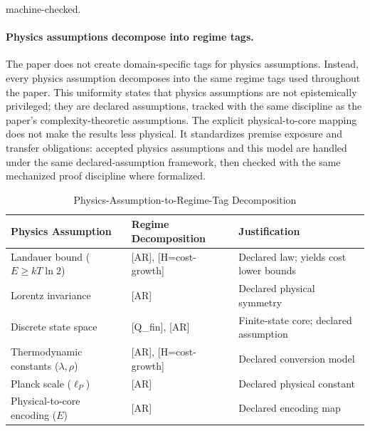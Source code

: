 machine-checked.

\paragraph{Physics assumptions decompose into regime tags.}
The paper does not create domain-specific tags for physics assumptions. Instead, every physics assumption decomposes into the same regime tags used throughout the paper. This uniformity states that physics assumptions are not epistemically privileged; they are declared assumptions, tracked with the same discipline as the paper's complexity-theoretic assumptions.
The explicit physical-to-core mapping does not make the results less physical. It standardizes premise exposure and transfer obligations: accepted physics assumptions and this model are handled under the same declared-assumption framework, then checked with the same mechanized proof discipline where formalized.

\begin{table}[h]
\centering
\caption{Physics-Assumption-to-Regime-Tag Decomposition}
\label{tab:physics-regime-decomposition}
\begin{tabular}{@{}lll@{}}
\toprule
\textbf{Physics Assumption} & \textbf{Regime Decomposition} & \textbf{Justification} \\
\midrule
Landauer bound ($E \ge kT\ln 2$) & [AR], [H=cost-growth] & Declared law; yields cost lower bounds \\
Lorentz invariance & [AR] & Declared physical symmetry \\
Discrete state space & [Q\_fin], [AR] & Finite-state core; declared assumption \\
Thermodynamic constants ($\lambda, \rho$) & [AR], [H=cost-growth] & Declared conversion model \\
Planck scale ($\ell_P$) & [AR] & Declared physical constant \\
Physical-to-core encoding ($E$) & [AR] & Declared encoding map \\
\bottomrule
\end{tabular}
\end{table}

